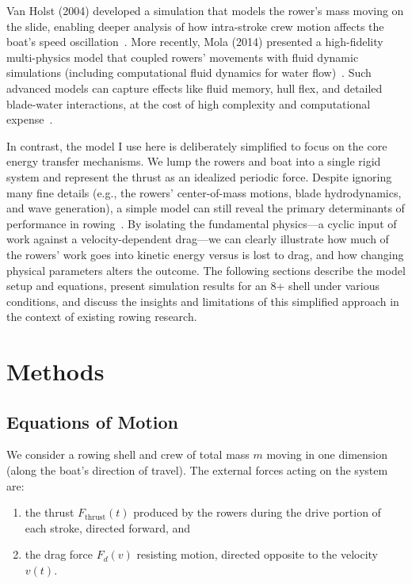 \documentclass[12pt]{article}
\begin{document}
Van Holst (2004) developed a simulation that models the rower’s mass moving on the slide, enabling deeper analysis of how intra-stroke crew motion affects the boat’s speed oscillation~\cite{vanholst2004}. More recently, Mola (2014) presented a high-fidelity multi-physics model that coupled rowers’ movements with fluid dynamic simulations (including computational fluid dynamics for water flow)~\cite{mola2014, mola2014}. Such advanced models can capture effects like fluid memory, hull flex, and detailed blade-water interactions, at the cost of high complexity and computational expense~\cite{mola2014}. 

In contrast, the model I use here is deliberately simplified to focus on the core energy transfer mechanisms. We lump the rowers and boat into a single rigid system and represent the thrust as an idealized periodic force. Despite ignoring many fine details (e.g., the rowers’ center-of-mass motions, blade hydrodynamics, and wave generation), a simple model can still reveal the primary determinants of performance in rowing~\cite{pulman2007, rowinginmotion2016}. By isolating the fundamental physics—a cyclic input of work against a velocity-dependent drag—we can clearly illustrate how much of the rowers’ work goes into kinetic energy versus is lost to drag, and how changing physical parameters alters the outcome. The following sections describe the model setup and equations, present simulation results for an 8+ shell under various conditions, and discuss the insights and limitations of this simplified approach in the context of existing rowing research.

\newpage

\section{Methods}

\subsection{Equations of Motion}

We consider a rowing shell and crew of total mass $m$ moving in one dimension (along the boat’s direction of travel). The external forces acting on the system are:
\begin{enumerate}
    \item the thrust $F_{\text{thrust}}(t)$ produced by the rowers during the drive portion of each stroke, directed forward, and
    \item the drag force $F_d(v)$ resisting motion, directed opposite to the velocity $v(t)$.
\end{enumerate}
\end{document}

